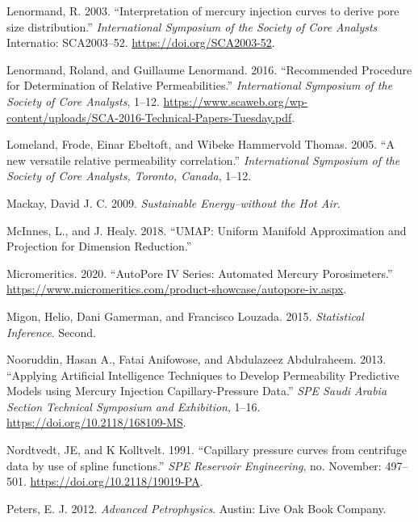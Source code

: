 \documentclass[english,msc,numbers]{coppe}
\begin{document}
  \leavevmode\hypertarget{ref-Lenormand2003}{}%
  Lenormand, R. 2003. ``Interpretation of mercury injection curves to derive pore size distribution.'' \emph{International Symposium of the Society of Core Analysts} Internatio: SCA2003--52. \url{https://doi.org/SCA2003-52}.
  
  \leavevmode\hypertarget{ref-Lenormand2016}{}%
  Lenormand, Roland, and Guillaume Lenormand. 2016. ``Recommended Procedure for Determination of Relative Permeabilities.'' \emph{International Symposium of the Society of Core Analysts}, 1--12. \url{https://www.scaweb.org/wp-content/uploads/SCA-2016-Technical-Papers-Tuesday.pdf}.
  
  \leavevmode\hypertarget{ref-Lomeland2005}{}%
  Lomeland, Frode, Einar Ebeltoft, and Wibeke Hammervold Thomas. 2005. ``A new versatile relative permeability correlation.'' \emph{International Symposium of the Society of Core Analysts, Toronto, Canada}, 1--12.
  
  \leavevmode\hypertarget{ref-Mackay2009}{}%
  Mackay, David J. C. 2009. \emph{Sustainable Energy--without the Hot Air}.
  
  \leavevmode\hypertarget{ref-McInnes2018}{}%
  McInnes, L., and J. Healy. 2018. ``UMAP: Uniform Manifold Approximation and Projection for Dimension Reduction.''
  
  \leavevmode\hypertarget{ref-Micromeritics2020}{}%
  Micromeritics. 2020. ``AutoPore IV Series: Automated Mercury Porosimeters.'' \url{https://www.micromeritics.com/product-showcase/autopore-iv.aspx}.
  
  \leavevmode\hypertarget{ref-Migon2015}{}%
  Migon, Helio, Dani Gamerman, and Francisco Louzada. 2015. \emph{Statistical Inference}. Second.
  
  \leavevmode\hypertarget{ref-Nooruddin2013}{}%
  Nooruddin, Hasan A., Fatai Anifowose, and Abdulazeez Abdulraheem. 2013. ``Applying Artificial Intelligence Techniques to Develop Permeability Predictive Models using Mercury Injection Capillary-Pressure Data.'' \emph{SPE Saudi Arabia Section Technical Symposium and Exhibition}, 1--16. \url{https://doi.org/10.2118/168109-MS}.
  
  \leavevmode\hypertarget{ref-Nordtvedt1991}{}%
  Nordtvedt, JE, and K Kolltvelt. 1991. ``Capillary pressure curves from centrifuge data by use of spline functions.'' \emph{SPE Reservoir Engineering}, no. November: 497--501. \url{https://doi.org/10.2118/19019-PA}.
  
  \leavevmode\hypertarget{ref-Peters2012}{}%
  Peters, E. J. 2012. \emph{Advanced Petrophysics}. Austin: Live Oak Book Company.
  
\end{document}
